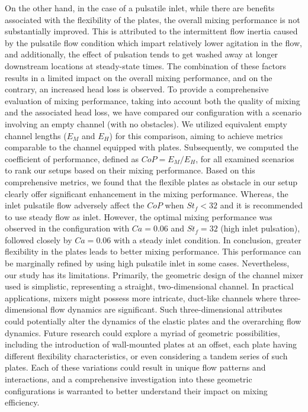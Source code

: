 \documentclass[%
aip,
amsmath,amssymb,
reprint,
]{revtex4-1}
\begin{document}
			On the other hand, in the case of a pulsatile inlet, while there are benefits associated with the flexibility of the plates, the overall mixing performance is not substantially improved. This is attributed to the intermittent flow inertia caused by the pulsatile flow condition which impart relatively lower agitation in the flow, and additionally, the effect of pulsation tends to get washed away at longer downstream locations at steady-state times. The combination of these factors results in a limited impact on the overall mixing performance, and on the contrary, an increased head loss is observed. To provide a comprehensive evaluation of mixing performance, taking into account both the quality of mixing and the associated head loss, we have compared our configuration with a scenario involving an empty channel (with no obstacles). We utilized equivalent empty channel lengths ($E_M$ and $E_H$) for this comparison, aiming to achieve metrics comparable to the channel equipped with plates. Subsequently, we computed the coefficient of performance, defined as $CoP=E_M/E_H$, for all examined scenarios to rank our setups based on their mixing performance. Based on this comprehensive metrics, we found that the flexible plates as obstacle in our setup clearly offer significant enhancement in the mixing performance. Whereas, the inlet pulsatile flow adversely affect the $CoP$ when $St_f<32$ and it is recommended to use steady flow as inlet. However, the optimal mixing performance was observed in the configuration with $Ca=0.06$ and $St_f=32$ (high inlet pulsation), followed closely by $Ca=0.06$ with a steady inlet condition.  In conclusion, greater flexibility in the plates leads to better mixing performance. This performance can be marginally refined by using high  pulsatile inlet in some cases.
			Nevertheless, our study has its limitations. Primarily, the geometric design of the channel mixer used is simplistic, representing a straight, two-dimensional channel. In practical applications, mixers might possess more intricate, duct-like channels where three-dimensional flow dynamics are significant. Such three-dimensional attributes could potentially alter the dynamics of the elastic plates and the overarching flow dynamics. Future research could explore a myriad of geometric possibilities, including the introduction of wall-mounted plates at an offset, each plate having different flexibility characteristics, or even considering a tandem series of such plates. Each of these variations could result in unique flow patterns and interactions, and a comprehensive investigation into these geometric configurations is warranted to better understand their impact on mixing efficiency.
			
\end{document}

